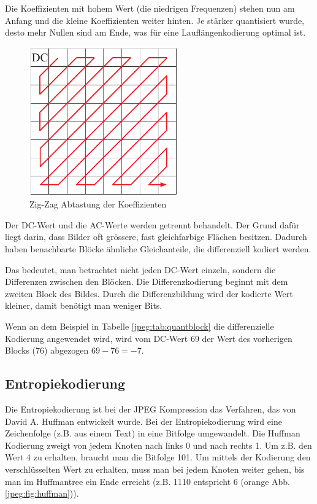 Die Koeffizienten mit hohem Wert (die niedrigen Frequenzen) stehen nun am Anfang und die kleine Koeffizienten weiter hinten.
Je stärker quantisiert wurde, desto mehr Nullen sind am Ende, was für eine Lauflängenkodierung optimal ist.

\begin{figure}
    \centering
    \includegraphics[width=64mm]{papers/jpeg/pictures/zigzag.pdf}
    \caption{Zig-Zag Abtastung der Koeffizienten
        \label{jpeg:fig:zigzag}}
\end{figure}

Der DC-Wert und die AC-Werte werden getrennt behandelt.
Der Grund dafür liegt darin, dass Bilder oft grössere, fast gleichfarbige Flächen besitzen.
Dadurch haben benachbarte Blöcke ähnliche Gleichanteile, die differenziell kodiert werden.

Das bedeutet, man betrachtet nicht jeden DC-Wert einzeln, sondern die Differenzen zwischen den Blöcken.
Die Differenzkodierung beginnt mit dem zweiten Block des Bildes.
Durch die Differenzbildung wird der kodierte Wert kleiner, damit benötigt man weniger Bits.

Wenn an dem Beispiel in Tabelle \ref{jpeg:tab:quantblock} die differenzielle Kodierung angewendet wird, wird vom DC-Wert 69 der Wert des vorherigen Blocks (76) abgezogen \(69-76 = -7\).

\subsection{Entropiekodierung
\label{jpeg:subsection:entropiekodierung}}
Die Entropiekodierung ist bei der JPEG Kompression das Verfahren, das von David A. Huffman entwickelt wurde.
Bei der Entropiekodierung wird eine Zeichenfolge (z.B. aus einem Text) in eine Bitfolge umgewandelt.
Die Huffman Kodierung zweigt von jedem Knoten nach links 0 und nach rechts 1.
Um z.B. den Wert 4 zu erhalten, braucht man die Bitfolge 101.
Um mittels der Kodierung den verschlüsselten Wert zu erhalten, muss man bei jedem Knoten weiter gehen, bis man im Huffmantree ein Ende erreicht (z.B. 1110 entspricht 6 (orange Abb. \ref{jpeg:fig:huffman})).

